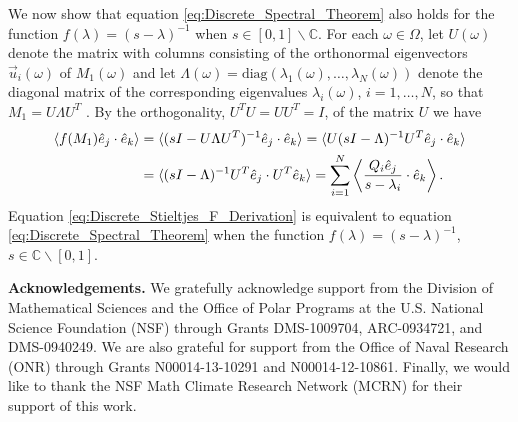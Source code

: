 \documentclass{cmslatex}
\begin{document}
We now show that equation \eqref{eq:Discrete_Spectral_Theorem} also
holds for the function $f(\lambda)=(s-\lambda)^{-1}$ when
$s\in[0,1]\backslash\mathbb{C}$. For each $\omega\in\Omega$, let $U(\omega)$ denote the matrix
with columns consisting of the orthonormal eigenvectors $\vec{u}_i(\omega)$
of $M_1(\omega)$ and let $\Lambda(\omega)=\text{diag}(\lambda_1(\omega),\ldots,\lambda_N(\omega))$ denote the
diagonal matrix of the corresponding eigenvalues $\lambda_i(\omega)$, $i=1,\ldots,N$,
so that $M_1=U\Lambda U^T$ \cite{Horn_Johnson-1990}. By the orthogonality,
$U^TU=UU^T=I$, of the matrix $U$ \cite{Horn_Johnson-1990} we have   
%
\begin{align}\label{eq:Discrete_Stieltjes_F_Derivation}
     \langle f(M_1)\hat{e}_j\cdot\hat{e}_k\rangle
        &=\langle(sI-U\Lambda U^T)^{-1}\hat{e}_j\cdot\hat{e}_k\rangle
        = \langle U(sI-\Lambda)^{-1}U^T\hat{e}_j\cdot\hat{e}_k\rangle\\
        &=\langle(sI-\Lambda)^{-1}U^T\hat{e}_j\cdot U^T\hat{e}_k\rangle
        =\sum_{i=1}^N\left\langle
          \frac{Q_i\hat{e}_j}{s-\lambda_i}\cdot\hat{e}_k
          \right\rangle.               
        \notag
\end{align}
%
Equation \eqref{eq:Discrete_Stieltjes_F_Derivation} is equivalent to equation
\eqref{eq:Discrete_Spectral_Theorem} when the function
$f(\lambda)=(s-\lambda)^{-1}$, $s\in\mathbb{C}\backslash[0,1]$.





\medskip

{\bf Acknowledgements.}
We gratefully acknowledge support from the Division of Mathematical
Sciences and the Office of Polar Programs at the U.S. 
National Science Foundation (NSF) through Grants
DMS-1009704, ARC-0934721, and DMS-0940249. We are also grateful for 
support from the Office of Naval Research (ONR) through
Grants N00014-13-10291 and N00014-12-10861. Finally, we would like to 
thank the NSF Math Climate Research Network (MCRN) for their support
of this work. 


\medskip



\end{document}
